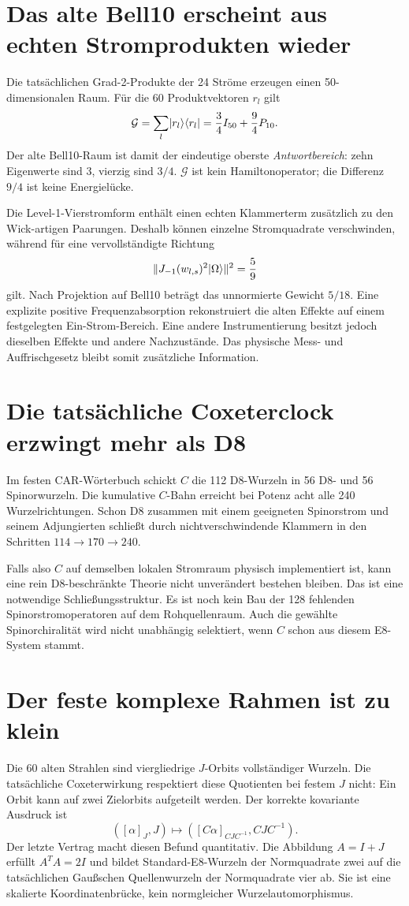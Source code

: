 \section{Das alte Bell10 erscheint aus echten Stromprodukten wieder}
Die tatsächlichen Grad-2-Produkte der 24 Ströme erzeugen einen 50-dimensionalen Raum. Für die 60 Produktvektoren $r_l$ gilt
\[
 \mathcal G=\sum_l\lvert r_l\rangle\langle r_l\rvert
 =\frac34I_{50}+\frac94P_{10}.
\]
Der alte Bell10-Raum ist damit der eindeutige oberste \emph{Antwortbereich}: zehn Eigenwerte sind $3$, vierzig sind $3/4$. $\mathcal G$ ist kein Hamiltonoperator; die Differenz $9/4$ ist keine Energielücke. 

Die Level-1-Vierstromform enthält einen echten Klammerterm zusätzlich zu den Wick-artigen Paarungen. Deshalb können einzelne Stromquadrate verschwinden, während für eine vervollständigte Richtung
\[
 \|J_{-1}(w_{l,s})^2\lvert \Omega\rangle\|^2=\frac59
\]
gilt. Nach Projektion auf Bell10 beträgt das unnormierte Gewicht $5/18$. Eine explizite positive Frequenzabsorption rekonstruiert die alten Effekte auf einem festgelegten Ein-Strom-Bereich. Eine andere Instrumentierung besitzt jedoch dieselben Effekte und andere Nachzustände. Das physische Mess- und Auffrischgesetz bleibt somit zusätzliche Information. 

\section{Die tatsächliche Coxeterclock erzwingt mehr als D8}
Im festen CAR-Wörterbuch schickt $C$ die 112 D8-Wurzeln in 56 D8- und 56 Spinorwurzeln. Die kumulative $C$-Bahn erreicht bei Potenz acht alle 240 Wurzelrichtungen. Schon D8 zusammen mit einem geeigneten Spinorstrom und seinem Adjungierten schließt durch nichtverschwindende Klammern in den Schritten $114\to170\to240$. 

Falls also $C$ auf demselben lokalen Stromraum physisch implementiert ist, kann eine rein D8-beschränkte Theorie nicht unverändert bestehen bleiben. Das ist eine notwendige Schließungsstruktur. Es ist noch kein Bau der 128 fehlenden Spinorstromoperatoren auf dem Rohquellenraum. Auch die gewählte Spinorchiralität wird nicht unabhängig selektiert, wenn $C$ schon aus diesem E8-System stammt.

\section{Der feste komplexe Rahmen ist zu klein}
Die 60 alten Strahlen sind viergliedrige $J$-Orbits vollständiger Wurzeln. Die tatsächliche Coxeterwirkung respektiert diese Quotienten bei festem $J$ nicht: Ein Orbit kann auf zwei Zielorbits aufgeteilt werden. Der korrekte kovariante Ausdruck ist
\[
 ([\alpha]_J,J)\longmapsto
 ([C\alpha]_{CJC^{-1}},CJC^{-1}).
\]
Der letzte Vertrag macht diesen Befund quantitativ. Die Abbildung $A=I+J$ erfüllt $A^TA=2I$ und bildet Standard-E8-Wurzeln der Normquadrate zwei auf die tatsächlichen Gaußschen Quellenwurzeln der Normquadrate vier ab. Sie ist eine skalierte Koordinatenbrücke, kein normgleicher Wurzelautomorphismus. 

